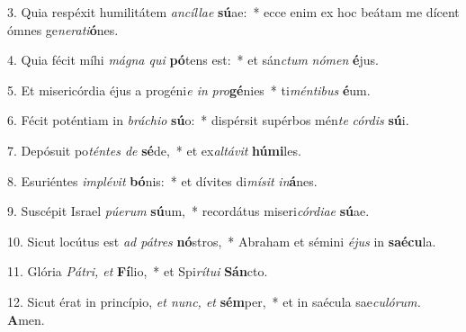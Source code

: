\item 3. Quia respéxit humilitátem \textit{ancíllae} \textbf{sú}ae:~* ecce enim ex hoc beátam me dícent ómnes ge\textit{nerati}\textbf{ó}nes.

\item 4. Quia fécit míhi \textit{mágna qui} \textbf{pó}tens est:~* et sán\textit{ctum} \textit{nómen} \textbf{é}jus.

\item 5. Et misericórdia éjus a progéni\textit{e in} \textit{pro}\textbf{gé}nies~* ti\textit{méntibus} \textbf{é}um.

\item 6. Fécit poténtiam in \textit{bráchio} \textbf{sú}o:~* dispérsit supérbos mén\textit{te} \textit{cór}\textit{dis} \textbf{sú}i.

\item 7. Depósuit po\textit{téntes de} \textbf{sé}de,~* et ex\textit{altávit} \textbf{húmi}les.

\item 8. Esuriéntes \textit{implévit} \textbf{bó}nis:~* et dívites di\textit{mísit} \textit{in}\textbf{á}nes.

\item 9. Suscépit Israel \textit{púerum} \textbf{sú}um,~* recordátus miseri\textit{córdiae} \textbf{sú}ae.

\item 10. Sicut locútus est \textit{ad pátres} \textbf{nó}stros,~* Abraham et sémini \textit{éjus} in \textbf{saécu}la.

\item 11. Glória \textit{Pátri, et} \textbf{Fí}lio,~* et Spi\textit{rítui} \textbf{Sán}cto.

\item 12. Sicut érat in princípio, \textit{et nunc, et} \textbf{sém}per,~* et in saécula sae\textit{culórum.} \textbf{A}men.